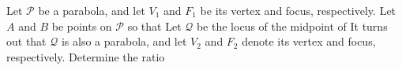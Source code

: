 Let $ \mathcal P$ be a parabola, and let $ V_1$ and $ F_1$ be its vertex and focus, respectively. Let $ A$ and $ B$ be points on $ \mathcal P$ so that  Let $ \mathcal Q$ be the locus of the midpoint of  It turns out that $ \mathcal Q$ is also a parabola, and let $ V_2$ and $ F_2$ denote its vertex and focus, respectively. Determine the ratio 